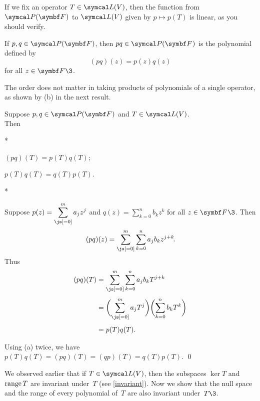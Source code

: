 If we fix an operator $T \in \L(V)$, then the function from $\P(\F{})$ to $\L(V)$ given by
$p \mapsto p(T)$ is linear, as you should  verify.

{If $p, q \in \P(\F{})$, then $pq \in \P(\F{})$ is the
polynomial defined by
\[
(pq)(z) = p(z) q(z)
\]
for all $z \in \F{}\3$.}

The order does not matter in taking products of polynomials of a single operator, as shown by (b) in the next result.

{Suppose $p, q \in \P(\F{})$ and $T \in \L(V)$.\\Then
\begin{subtheorem}*
\item
$(pq)(T) = p(T)q(T)$;
\item
$p(T)q(T) = q(T)p(T)$.
\end{subtheorem}
}

\proof
\begin{subtheorem}*
\item
Suppose $\displaystyle p(z) = \sum_{\js[=0]}^m a_j z^j$ and $\displaystyle q(z) = \sum_{k=0}^n b_k z^k$ for all $z \in \F{}\3$. Then
\[
(pq)(z) = \sum_{\js[=0]}^m \sum_{k=0}^n a_j b_k z^{j+k}\!.
\]
Thus
\begin{align*}
(pq)(T) &= \sum_{\js[=0]}^m \sum_{k=0}^n a_j b_k T^{j+k}\\[4bp]
&= \paren[\bigg]{ \sum_{\js[=0]}^m a_j T^j } \paren[\bigg]{ \sum_{k=0}^n b_k T^k } \\[4bp]
&= p(T) q(T).
\end{align*}

\item
Using (a) twice, we have $p(T)q(T) = (pq)(T) = (qp)(T) = q(T)p(T)$.
\qed
\end{subtheorem}

We observed earlier that if $T \in \L(V)$, then the subspaces $\ker T$ and $\operatorname{range} T$ are invariant under~$T$ (see \ref{invariant}).
Now we show that the null space and the range of every polynomial of~$T$ are also invariant under~$T\3$.


